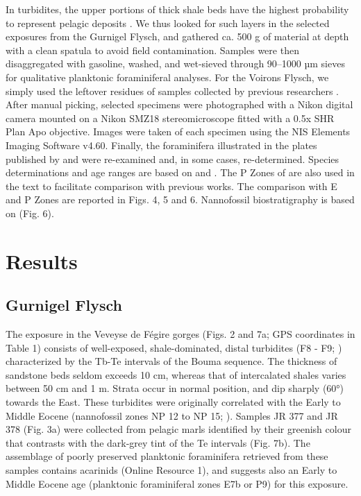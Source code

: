 \documentclass[twoside]{article}
\begin{document}
In turbidites, the upper portions of thick shale beds have the highest probability to represent pelagic deposits \citep{Mutti2003,Mulder2001}. We thus looked for such layers in the selected exposures from the Gurnigel  Flysch, and gathered ca. 500 g of material at depth with a clean spatula to avoid field contamination. Samples were then disaggregated with gasoline, washed, and wet-sieved through 90–1000 µm sieves for qualitative planktonic foraminiferal analyses. For the Voirons Flysch, we simply used the leftover residues of samples collected by previous researchers \citep{Frebourg2006,Ospina-Ostios2017}. After manual picking, selected specimens were photographed with a Nikon digital camera mounted on a Nikon SMZ18 stereomicroscope fitted with a 0.5x SHR Plan Apo objective. Images were taken of each specimen using the NIS Elements Imaging Software v4.60. Finally, the foraminifera illustrated in the plates published by \cite{Ospina-Ostios2013} and \cite{Ospina-Ostios2017} were re-examined and, in some cases, re-determined. Species determinations and age ranges are based on \cite{Pearson2006} and \cite{Wade2011a}. The P Zones of \cite{Berggren1995a} are also used in the text to facilitate comparison with previous works. The comparison with E and P Zones are reported in Figs. 4, 5 and 6. Nannofossil biostratigraphy is based on \cite{Martini1971} (Fig. 6).\par
	
\section{Results}

\subsection{Gurnigel Flysch}

The exposure in the Veveyse de Fégire gorges (Figs. 2 and 7a; GPS coordinates in Table 1) consists of well-exposed, shale-dominated, distal turbidites (F8 - F9; \citealp{Mutti2003}) characterized by the Tb-Te intervals of the Bouma sequence. The thickness of sandstone beds seldom exceeds 10 cm, whereas that of intercalated shales varies between 50 cm and 1 m. Strata occur in normal position, and dip sharply (60°) towards the East. These turbidites were originally correlated with the Early to Middle Eocene (nannofossil zones NP 12 to NP 15; \citealp{Weidmann1976a}). Samples JR 377 and JR 378 (Fig. 3a) were collected from pelagic marls identified by their greenish colour that contrasts with the dark-grey tint of the Te intervals (Fig. 7b). The assemblage of poorly preserved planktonic foraminifera retrieved from these samples contains acarinids (Online Resource 1), and suggests also an Early to Middle Eocene age (planktonic foraminiferal zones E7b or P9) for this exposure.\par
\end{document}

